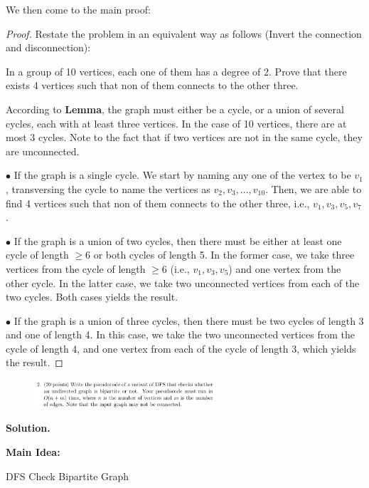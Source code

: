 \documentclass[10pt]{article}
\begin{document}
We then come to the main proof:
\begin{proof}
	Restate the problem in an equivalent way as follows (Invert the connection and disconnection):

	In a group of 10 vertices, each one of them has a degree of 2. Prove that there exists 4 vertices such that non of them connects to the other three.

	According to \textbf{Lemma}, the graph must either be a cycle, or a union of several cycles, each with at least three vertices. In the case of 10 vertices, there are at most 3 cycles. Note to the fact that if two vertices are not in the same cycle, they are unconnected.
	
	$\bullet$ If the graph is a single cycle. We start by naming any one of the vertex to be $v_1$, transversing the cycle to name the vertices as $v_2, v_3, ..., v_{10}$. Then, we are able to find 4 vertices such that non of them connects to the other three, i.e., $v_1, v_3, v_5, v_7$.
	
	$\bullet$ If the graph is a union of two cycles, then there must be either at least one cycle of length $\geq 6$ or both cycles of length 5. In the former case, we take three vertices from the cycle of length $\geq 6$ (i.e., $v_1, v_3, v_5$) and one vertex from the other cycle. In the latter case, we take two unconnected vertices from each of the two cycles. Both cases yields the result.

	$\bullet$ If the graph is a union of three cycles, then there must be two cycles of length 3 and one of length 4. In this case, we take the two unconnected vertices from the cycle of length 4, and one vertex from each of the cycle of length 3, which yields the result.

\end{proof}

\newpage

\begin{figure}[h]
	\centering
	\includegraphics[width=0.6\textwidth]{hw4-2}
\end{figure}

\textbf{Solution.}

\textbf{Main Idea:}
\begin{algorithm}
	\SetAlgoLined

	\caption{DFS Check Bipartite Graph}
\end{algorithm}
\end{document}
